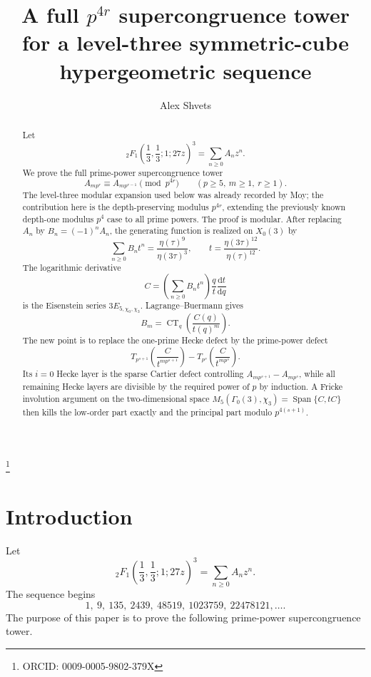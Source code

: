 \documentclass[11pt]{amsart}
\theoremstyle{remark}
\DeclareMathOperator{\CT}{CT}
\DeclareMathOperator{\Span}{Span}
\newcommand{\dd}{\mathrm d}
\begin{document}
\title[A full $p^{4r}$ supercongruence tower]{A full $p^{4r}$ supercongruence tower for a level-three symmetric-cube hypergeometric sequence}

\author{Alex Shvets}
\address{Haifa, Israel}
\thanks{ORCID: 0009-0005-9802-379X}

\begin{abstract}
Let
\[
 {}_2F_1\!\left(\frac13,\frac13;1;27z\right)^3=\sum_{n\ge0}A_nz^n.
\]
We prove the full prime-power supercongruence tower
\[
 A_{mp^r}\equiv A_{mp^{r-1}}\pmod {p^{4r}}
 \qquad (p\ge5,\ m\ge1,\ r\ge1).
\]
The level-three modular expansion used below was already recorded by Moy; the contribution here is the depth-preserving modulus $p^{4r}$, extending the previously known depth-one modulus $p^4$ case to all prime powers.
The proof is modular.  After replacing $A_n$ by $B_n=(-1)^nA_n$, the generating function is realized on $X_0(3)$ by
\[
 \sum_{n\ge0}B_nt^n=\frac{\eta(\tau)^9}{\eta(3\tau)^3},
 \qquad
 t=\frac{\eta(3\tau)^{12}}{\eta(\tau)^{12}}.
\]
The logarithmic derivative
\[
 C=\left(\sum_{n\ge0}B_nt^n\right)\frac{q}{t}\frac{\dd t}{\dd q}
\]
is the Eisenstein series $3E_{5,\chi_0,\chi_3}$.  Lagrange--Buermann gives
\[
 B_m=\CT_q\left(\frac{C(q)}{t(q)^m}\right).
\]
The new point is to replace the one-prime Hecke defect by the prime-power defect
\[
 T_{p^{s+1}}\left(\frac{C}{t^{mp^{s+1}}}\right)
 -T_{p^s}\left(\frac{C}{t^{mp^s}}\right).
\]
Its $i=0$ Hecke layer is the sparse Cartier defect controlling
$A_{mp^{s+1}}-A_{mp^s}$, while all remaining Hecke layers are divisible by the required power of $p$ by induction.  A Fricke involution argument on the two-dimensional space
$M_5(\Gamma_0(3),\chi_3)=\Span\{C,tC\}$ then kills the low-order part exactly and the principal part modulo $p^{4(s+1)}$.
\end{abstract}

\maketitle

\section{Introduction}

Let
\[
 {}_2F_1\!\left(\frac13,\frac13;1;27z\right)^3=\sum_{n\ge0}A_nz^n.
\]
The sequence begins
\[
1,\ 9,\ 135,\ 2439,\ 48519,\ 1023759,\ 22478121,\ldots .
\]
The purpose of this paper is to prove the following prime-power supercongruence tower.
\end{document}

